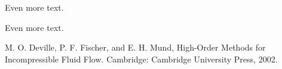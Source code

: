\documentclass[final,t]{beamer}
\begin{document}
\begin{frame}[fragile]{}
\begin{columns}[t]


    \begin{column}{.45\linewidth}
      \begin{tcolorbox}[toplevelbox,adjusted title=Tech Detail 2]
        Even more text.
      \end{tcolorbox}

      \begin{tcolorbox}[toplevelbox,adjusted title=Results]
        Even more text.
      \end{tcolorbox}

      \begin{tcolorbox}[toplevelbox,adjusted title=References]
      M. O. Deville, P. F. Fischer, and E. H. Mund, High-Order Methods for Incompressible Fluid Flow. Cambridge: Cambridge University Press, 2002.
      \end{tcolorbox}

    \end{column}


  \end{columns}
\end{frame}
\end{document}
